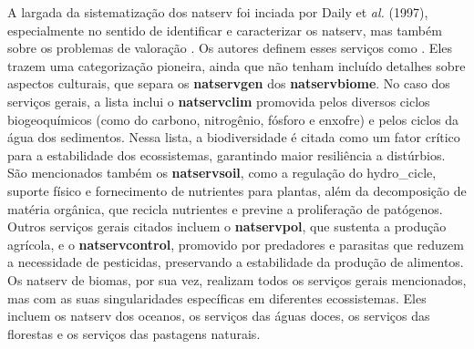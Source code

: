 \documentclass[./main.tex]{subfiles}
\begin{document}
\par A largada da sistematização dos \gls{natserv} foi inciada por Daily et \textit{al.} (1997), especialmente no sentido de identificar e caracterizar os \gls{natserv}, mas também sobre os problemas de valoração \cite{daily1997}. Os autores definem esses serviços como . Eles trazem uma categorização pioneira, ainda que não tenham incluído detalhes sobre aspectos culturais, que separa os \textbf{\gls{natservgen}} dos \textbf{\gls{natservbiome}}. No caso dos serviços gerais, a lista inclui o \textbf{\gls{natservclim}} promovida pelos diversos ciclos biogeoquímicos (como do carbono, nitrogênio, fósforo e enxofre) e pelos ciclos da água dos sedimentos. Nessa lista, a biodiversidade é citada como um fator crítico para a estabilidade dos ecossistemas, garantindo maior resiliência a distúrbios. São mencionados também os \textbf{\gls{natservsoil}}, como a regulação do \gls{hydro_cicle}, suporte físico e fornecimento de nutrientes para plantas, além da decomposição de matéria orgânica, que recicla nutrientes e previne a proliferação de patógenos. Outros serviços gerais citados incluem o \textbf{\gls{natservpol}}, que sustenta a produção agrícola, e o \textbf{\gls{natservcontrol}}, promovido por predadores e parasitas que reduzem a necessidade de pesticidas, preservando a estabilidade da produção de alimentos. Os \gls{natserv} de biomas, por sua vez, realizam todos os serviços gerais mencionados, mas com as suas singularidades específicas em diferentes ecossistemas. Eles incluem os \gls{natserv} dos oceanos, os serviços das águas doces, os serviços das florestas e os serviços das pastagens naturais.
\end{document}

